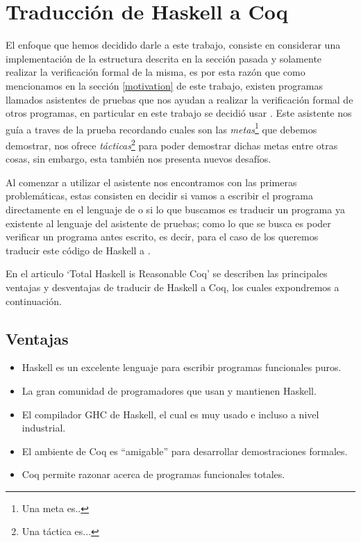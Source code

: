 \section{Traducción de Haskell a Coq}
El enfoque que hemos decidido darle a este trabajo, consiste en considerar una implementaci\'on de la estructura descrita en la secci\'on pasada y solamente realizar la verificaci\'on formal de la misma, es por esta raz\'on que como mencionamos en la secci\'on \ref{motivation} de este trabajo, existen programas llamados asistentes de pruebas que nos ayudan a realizar la
verificaci\'on formal de otros programas, en particular en este
trabajo se decidió usar {\coq}. Este asistente nos gu\'ia a traves de la prueba recordando cuales
son las \textit{metas}\footnote{Una meta es..} que debemos demostrar, nos ofrece \textit{t\'acticas}\footnote{Una táctica es...} para poder demostrar dichas metas
entre otras cosas, sin embargo, esta tambi\'en nos presenta nuevos desaf\'ios.

Al comenzar a utilizar el asistente nos encontramos con las primeras problem\'aticas, estas
consisten en decidir si vamos a escribir el programa directamente en el lenguaje de {\coq} o si lo que
buscamos es traducir un programa ya existente al lenguaje del asistente de pruebas; como lo que se
busca es poder verificar un programa antes escrito, es decir, para el caso de los {\arns} queremos traducir
este código de Haskell a {\coq}.

En el articulo `Total Haskell is Reasonable Coq' \cite{thrc} se describen las principales ventajas
y desventajas de traducir de Haskell a Coq, los cuales expondremos a continuaci\'on.

\subsection{Ventajas}
\begin{itemize}
    \item Haskell es un excelente lenguaje para escribir programas funcionales puros.
    \item La gran comunidad de programadores que usan y mantienen Haskell.
    \item El compilador GHC de Haskell, el cual es muy usado e incluso a nivel industrial.
    \item El ambiente de Coq es ``amigable'' para desarrollar demostraciones formales.
    \item Coq permite razonar acerca de programas funcionales totales.
\end{itemize}

